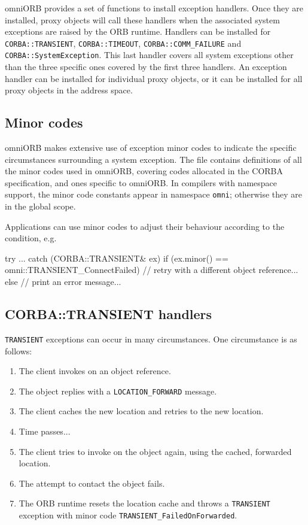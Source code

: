 \documentclass[11pt,twoside,a4paper]{book}
\newcommand{\code}[1]{\texttt{#1}}
\newcommand{\file}{\begingroup \urlstyle{tt}\Url}
\newcommand{\dsc}{\discretionary{}{}{}}
\begin{document}
omniORB provides a set of functions to install exception handlers.
Once they are installed, proxy objects will call these handlers when
the associated system exceptions are raised by the ORB runtime.
Handlers can be installed for \code{CORBA::\dsc{}TRANSIENT},
\code{CORBA::\dsc{}TIMEOUT}, \code{CORBA::COMM\_FAILURE} and
\code{CORBA::\dsc{}SystemException}.  This last handler covers all
system exceptions other than the three specific ones covered by the
first three handlers. An exception handler can be installed for
individual proxy objects, or it can be installed for all proxy objects
in the address space.


\subsection{Minor codes}

omniORB makes extensive use of exception minor codes to indicate the
specific circumstances surrounding a system exception.  The file
\file{include/omniORB4/minorCode.h} contains definitions of all the
minor codes used in omniORB, covering codes allocated in the CORBA
specification, and ones specific to omniORB. In compilers with
namespace support, the minor code constants appear in namespace
\code{omni}; otherwise they are in the global scope.

Applications can use minor codes to adjust their behaviour according
to the condition, e.g.

\begin{cxxlisting}
try {
  ...
}
catch (CORBA::TRANSIENT& ex) {
  if (ex.minor() == omni::TRANSIENT_ConnectFailed) {
    // retry with a different object reference...
  }
  else {
    // print an error message...
  }
}
\end{cxxlisting}



\subsection{CORBA::TRANSIENT handlers}

\code{TRANSIENT} exceptions can occur in many circumstances. One
circumstance is as follows:

\begin{enumerate}

\item The client invokes on an object reference.
\item The object replies with a \code{LOCATION\_FORWARD} message.
\item The client caches the new location and retries to the new location.
\item Time passes...
\item The client tries to invoke on the object again, using the
      cached, forwarded location. 
\item The attempt to contact the object fails.
\item The ORB runtime resets the location cache and throws a
      \code{TRANSIENT} exception with minor code
      \code{TRANSIENT\_FailedOnForwarded}.

\end{enumerate}
\end{document}
